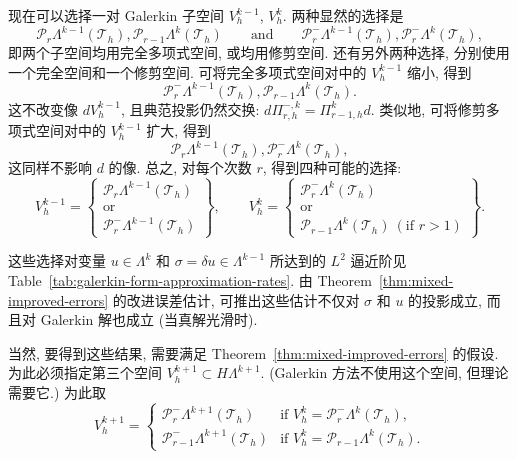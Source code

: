 {现在可以选择一对 Galerkin 子空间 $V_h^{k-1}$, $V_h^k$. 两种显然的选择是}
\[
\mathcal P_r\Lambda^{k-1}(\mathcal T_h),\mathcal P_{r-1}\Lambda^k(\mathcal T_h)\qquad\text{and}\qquad\mathcal P_r^-\Lambda^{k-1}(\mathcal T_h),\mathcal P_r^-\Lambda^k(\mathcal T_h),
\]
{即两个子空间均用完全多项式空间, 或均用修剪空间. 还有另外两种选择, 分别使用一个完全空间和一个修剪空间. 可将完全多项式空间对中的 $V_h^{k-1}$ 缩小, 得到}
\[
\mathcal P_r^-\Lambda^{k-1}(\mathcal T_h),\mathcal P_{r-1}\Lambda^k(\mathcal T_h).
\]
{这不改变像 $dV_h^{k-1}$, 且典范投影仍然交换: $d\Pi_{r,h}^{-,k}=\Pi_{r-1,h}^kd$. 类似地, 可将修剪多项式空间对中的 $V_h^{k-1}$ 扩大, 得到}
\[
\mathcal P_r\Lambda^{k-1}(\mathcal T_h),\mathcal P_r^-\Lambda^k(\mathcal T_h),
\]
{这同样不影响 $d$ 的像. 总之, 对每个次数 $r$, 得到四种可能的选择:}
\begin{equation}\label{eq:four-galerkin-form-pairs}
V_h^{k-1}=\left\{\begin{gathered}\mathcal P_r\Lambda^{k-1}(\mathcal T_h)\\\text{or}\\\mathcal P_r^-\Lambda^{k-1}(\mathcal T_h)\end{gathered}\right\},\qquad
V_h^k=\left\{\begin{gathered}\mathcal P_r^-\Lambda^k(\mathcal T_h)\\\text{or}\\\mathcal P_{r-1}\Lambda^k(\mathcal T_h)\ (\text{if }r>1)\end{gathered}\right\}.
\end{equation}

{这些选择对变量 $u\in\Lambda^k$ 和 $\sigma=\delta u\in\Lambda^{k-1}$ 所达到的 $L^2$ 逼近阶见 Table~\ref{tab:galerkin-form-approximation-rates}. 由 Theorem~\ref{thm:mixed-improved-errors} 的改进误差估计, 可推出这些估计不仅对 $\sigma$ 和 $u$ 的投影成立, 而且对 Galerkin 解也成立 (当真解光滑时).}

{当然, 要得到这些结果, 需要满足 Theorem~\ref{thm:mixed-improved-errors} 的假设. 为此必须指定第三个空间 $V_h^{k+1}\subset H\Lambda^{k+1}$. (Galerkin 方法不使用这个空间, 但理论需要它.) 为此取}
\[
V_h^{k+1}=\begin{cases}\mathcal P_r^-\Lambda^{k+1}(\mathcal T_h)&\text{if }V_h^k=\mathcal P_r^-\Lambda^k(\mathcal T_h),\\\mathcal P_{r-1}^-\Lambda^{k+1}(\mathcal T_h)&\text{if }V_h^k=\mathcal P_{r-1}\Lambda^k(\mathcal T_h).
\end{cases}
\]

